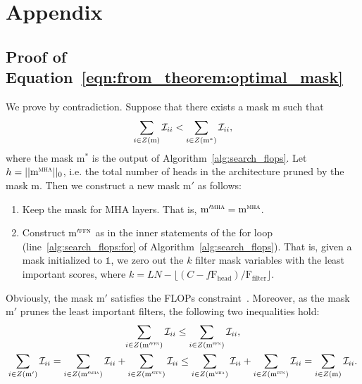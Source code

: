 \section{Appendix}

\subsection{\textbf{Proof of Equation~\ref{eqn:from_theorem:optimal_mask}}}
\label{appendix:optimality_proof}

We prove 
by contradiction.
Suppose that there exists a mask $\text{m}$ such that 
\begin{equation}
\small
    \sum_{i \in Z(\text{m})} \mathcal{I}_{ii} < \sum_{i \in Z(\text{m}^\ast)} \mathcal{I}_{ii} \label{eq:alg1_pf},
\end{equation}
where the mask $\text{m}^\ast$ is the output of Algorithm~\ref{alg:search_flops}.
Let $h = || \text{m}^{\textsc{mha}} ||_0$, i.e. the total number of heads in the architecture pruned by the mask $\text{m}$.
Then we construct a new mask $\text{m}'$ as follows:
\begin{enumerate}
    \item Keep the mask for MHA layers.
    That is, $\text{m}'^{\textsc{mha}} = \text{m}^{\textsc{mha}}$.
    \item Construct $\text{m}'^{\textsc{ffn}}$ as in the inner statements of the for loop (line~\ref{alg:search_flops:for} of Algorithm~\ref{alg:search_flops}).
    That is, given a mask initialized to $\mathbb{1}$, we zero out the $k$ filter mask variables with the least important scores, where $k = LN - \lfloor (C - f \text{F}_{\text{head}}) / \text{F}_\text{filter} \rfloor$.
\end{enumerate}
Obviously, the mask $\text{m}'$ satisfies the FLOPs constraint~.
Moreover, as the mask $\text{m}'$ prunes the least important filters, the following two inequalities hold:
\begin{gather}
    \sum_{i \in Z(\text{m}'^{\textsc{ffn}})} \mathcal{I}_{ii} \leq \sum_{i \in Z(\text{m}^{\textsc{ffn}})} \mathcal{I}_{ii}, \\
    \sum_{i \in Z(\text{m}')} \mathcal{I}_{ii} = \sum_{i \in Z(\text{m}'^{\textsc{mha}})} \mathcal{I}_{ii} + \sum_{i \in Z(\text{m}'^{\textsc{ffn}})} \mathcal{I}_{ii} \leq \sum_{i \in Z(\text{m}^{\textsc{mha}})} \mathcal{I}_{ii} + \sum_{i \in Z(\text{m}^{\textsc{ffn}})} \mathcal{I}_{ii} = \sum_{i \in Z(\text{m})} \mathcal{I}_{ii}.
\end{gather}

